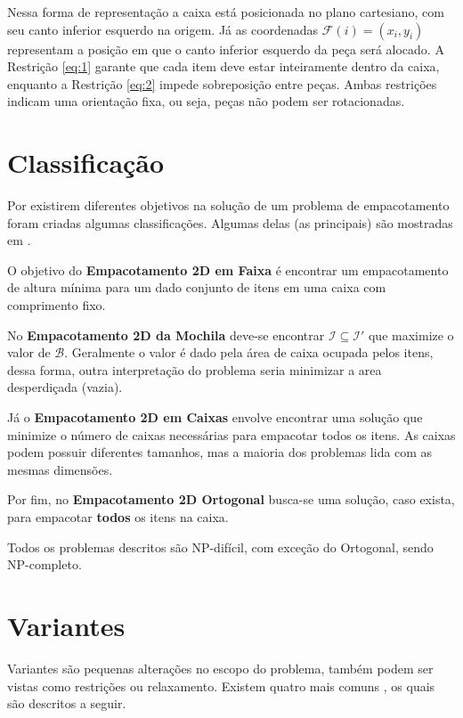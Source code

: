 Nessa forma de representação a caixa está posicionada no plano cartesiano, com seu canto inferior esquerdo na origem.
Já as coordenadas $\mathcal{F}(i) = (x_i, y_i)$ representam a posição em que o canto inferior esquerdo da peça será alocado.
A Restrição \ref{eq:1} garante que cada item deve estar inteiramente dentro da caixa, enquanto a Restrição \ref{eq:2} impede sobreposição entre peças.
Ambas restrições indicam uma orientação fixa, ou seja, peças não podem ser rotacionadas.


\section{Classificação}\label{sec:classificacao}

Por existirem diferentes objetivos na solução de um problema de empacotamento foram criadas algumas classificações.
Algumas delas (as principais) são mostradas em \cite{exact-solution-techniques}.

O objetivo do \textbf{Empacotamento 2D em Faixa} é encontrar um empacotamento de altura mínima para um dado conjunto de itens em uma caixa com comprimento fixo.

No \textbf{Empacotamento 2D da Mochila} deve-se encontrar $\mathcal{I} \subseteq \mathcal{I}'$ que maximize o valor de $\mathcal{B}$.
Geralmente o valor é dado pela área de caixa ocupada pelos itens, dessa forma, outra interpretação do problema seria minimizar a area desperdiçada (vazia).

Já o \textbf{Empacotamento 2D em Caixas} envolve encontrar uma solução que minimize o número de caixas necessárias para empacotar todos os itens.
As caixas podem possuir diferentes tamanhos, mas a maioria dos problemas lida com as mesmas dimensões.

Por fim, no \textbf{Empacotamento 2D Ortogonal} busca-se uma solução, caso exista, para empacotar \textbf{todos} os itens na caixa.

Todos os problemas descritos são NP-difícil, com exceção do Ortogonal, sendo NP-completo\cite{2DPackLib}.


\section{Variantes}\label{sec:variantes}


Variantes são pequenas alterações no escopo do problema, também podem ser vistas como restrições ou relaxamento.
Existem quatro mais comuns \cite{2DPackLib}, os quais são descritos a seguir.


